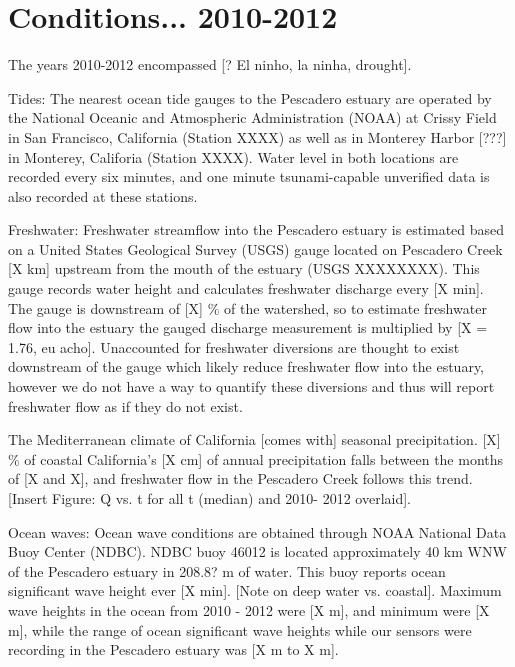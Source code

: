 

\section{Conditions... 2010-2012}
\label{conditions_label}

The years 2010-2012 encompassed [? El ninho, la ninha, drought].

Tides: 
The nearest ocean tide gauges to the Pescadero estuary are operated by the National Oceanic and Atmospheric Administration (NOAA) at Crissy Field in San Francisco, California (Station XXXX) as well as in Monterey Harbor [???] in Monterey, Califoria (Station XXXX). Water level in both locations are recorded every six minutes, and one minute tsunami-capable unverified data is also recorded at these stations. 

Freshwater:
Freshwater streamflow into the Pescadero estuary is estimated based on a United States Geological Survey (USGS) gauge located on Pescadero Creek [X km] upstream from the mouth of the estuary (USGS XXXXXXXX). This gauge records water height and calculates freshwater discharge every [X min]. The gauge is downstream of [X] \% of the watershed, so to estimate freshwater flow into the estuary the gauged discharge measurement is multiplied by [X = 1.76, eu acho]. Unaccounted for freshwater diversions are thought to exist downstream of the gauge which likely reduce freshwater flow into the estuary, however we do not have a way to quantify these diversions and thus will report freshwater flow as if they do not exist.

The Mediterranean climate of California [comes with] seasonal precipitation. [X] \% of coastal California's [X cm] of annual precipitation falls between the months of [X and X], and freshwater flow in the Pescadero Creek follows this trend. [Insert Figure: Q vs. t for all t (median) and 2010- 2012 overlaid]. 

Ocean waves:
Ocean wave conditions are obtained through NOAA National Data Buoy Center (NDBC). NDBC buoy 46012 is located approximately 40 km WNW of the Pescadero estuary in 208.8? m of water. This buoy reports ocean significant wave height ever [X min]. [Note on deep water vs. coastal]. Maximum wave heights in the ocean from 2010 - 2012 were [X m], and minimum were [X m], while the range of ocean significant wave heights while our sensors were recording in the Pescadero estuary was [X m to X m]. 

